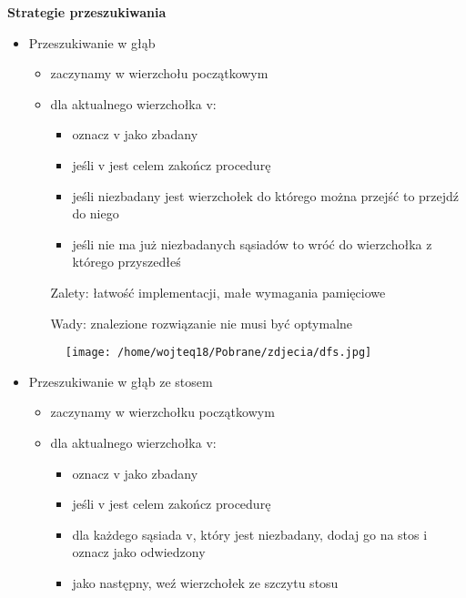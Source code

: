 \documentclass{article}
\begin{document}
\vspace{1\baselineskip}
\textbf{Strategie przeszukiwania} \par
\vspace{1\baselineskip}
\begin{itemize}
    \item Przeszukiwanie w głąb
        \begin{itemize}
            \item zaczynamy w wierzchołu początkowym
            \item dla aktualnego wierzchołka v:
                \begin{itemize}
                    \item oznacz v jako zbadany
                    \item jeśli v jest celem zakończ procedurę
                    \item jeśli niezbadany jest wierzchołek do którego można przejść to przejdź do niego
                    \item jeśli nie ma już niezbadanych sąsiadów to wróć do wierzchołka z którego przyszedłeś
                \end{itemize}
                Zalety: łatwość implementacji, małe wymagania pamięciowe \par
                Wady: znalezione rozwiązanie nie musi być optymalne
        \end{itemize}
        \begin{figure}[H]
            \centering
            \texttt{[image: /home/wojteq18/Pobrane/zdjecia/dfs.jpg]}
            \label{fig:dfs_image}
        \end{figure}
    \item Przeszukiwanie w głąb ze stosem
        \begin{itemize}
            \item zaczynamy w wierzchołku początkowym
            \item dla aktualnego wierzchołka v:
                \begin{itemize}
                    \item oznacz v jako zbadany
                    \item jeśli v jest celem zakończ procedurę
                    \item dla każdego sąsiada v, który jest niezbadany, dodaj go na stos i oznacz jako odwiedzony
                    \item jako następny, weź wierzchołek ze szczytu stosu
                \end{itemize}

\end{itemize}
\end{itemize}
\end{document}
